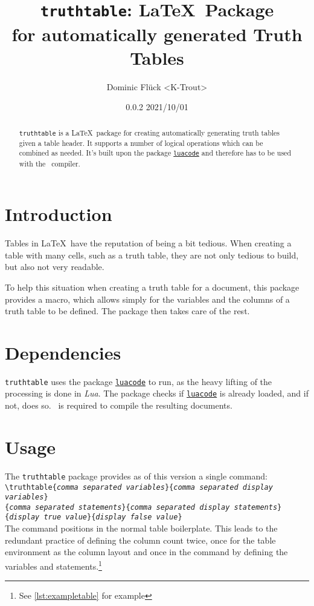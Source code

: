 \documentclass[a4paper]{article}
\title{\texttt{truthtable}\textbf{: \LaTeX\ Package\\for automatically generated Truth Tables}}
\author{Dominic Flück <K-Trout>}
\date{0.0.2 2021/10/01}
\begin{document}
\maketitle

\begin{abstract}
	\noindent \texttt{truthtable} is a \LaTeX\ package for creating automatically generating truth tables given a table header. It supports a number of logical operations which can be combined as needed. It's built upon the package \href{https://ctan.org/pkg/luacode}{\texttt{luacode}} and therefore has to be used with the \LuaLaTeX\ compiler.
\end{abstract}

\tableofcontents

\section{Introduction}
Tables in \LaTeX\ have the reputation of being a bit tedious. When creating a table with many cells, such as a truth table, they are not only tedious to build, but also not very readable.

To help this situation when creating a truth table for a document, this package provides a macro, which allows simply for the variables and the columns of a truth table to be defined. The package then takes care of the rest.

\section{Dependencies}

\texttt{truthtable} uses the package \href{https://ctan.org/pkg/luacode}{\texttt{luacode}} to run, as the heavy lifting of the processing is done in \emph{Lua}. 	The package checks if \href{https://ctan.org/pkg/luacode}{\texttt{luacode}} is already loaded, and if not, does so. \LuaLaTeX\ is required to compile the resulting documents.

\section{Usage}

The \texttt{truthtable} package provides as of this version a single command:\bigskip\\
\noindent\texttt{\textbackslash truthtable\{\emph{comma separated variables}\}\{\emph{comma separated display variables}\}\\\{\emph{comma separated statements}\}\{\emph{comma separated display statements}\}\\\{\emph{display true value}\}\{\emph{display false value}\}}
\bigskip\\
The command positions in the normal table boilerplate. This leads to the redundant practice of defining the column count twice, once for the table environment as the column layout and once in the command by defining the variables and statements.\footnote{See \autoref{lst:exampletable} for example}
\end{document}

